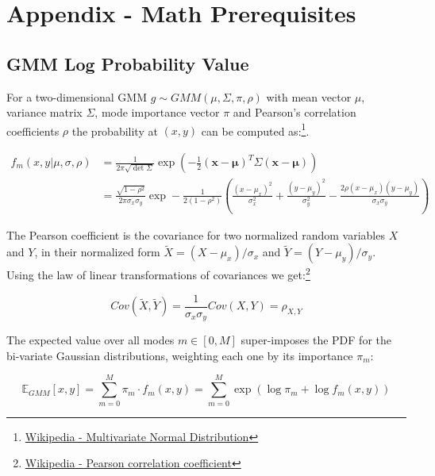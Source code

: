 \chapter{Appendix - Math Prerequisites}

\section{GMM Log Probability Value}
\label{appendix:gmm_log_prob}
For a two-dimensional \ac{GMM} $g \sim GMM(\mu, \Sigma, \pi, \rho)$ with mean vector $\mu$, variance matrix $\Sigma$, mode importance vector $\pi$ and Pearson's correlation coefficients $\rho$ the probability at $(x, y)$ can be computed as:\footnote{\href{https://de.wikipedia.org/wiki/Mehrdimensionale_Normalverteilung}{Wikipedia - Multivariate Normal Distribution}}.

\begin{align}
f_m(x, y | \mu, \sigma, \rho) 
&= \frac{1}{2 \pi \sqrt{\det \Sigma}} \exp \left(- \frac{1}{2} (\boldsymbol{x} - \boldsymbol{\mu})^T \Sigma (\boldsymbol{x} - \boldsymbol{\mu}) \right) \\
&= {\frac{\sqrt{1- \rho^2}}{2 \pi \sigma_x \sigma_y} 
\exp - \frac{1}{2 (1 - \rho^2)}} \left( \frac{( x - \mu _x)^2}{\sigma_x^2} +
\frac {(y - \mu_y)^2}{\sigma_y^2}-{\frac {2\rho (x - \mu_x)(y - \mu_y)}
{\sigma_x \sigma_y}} \right)	
\end{align}

The Pearson coefficient is the covariance for two normalized random variables $X$ and $Y$, in their normalized form $\tilde{X} = (X - \mu_x)/\sigma_x$ and $\tilde{Y} = (Y - \mu_y) / \sigma_y$. Using the law of linear transformations of covariances we get:\footnote{\href{https://en.wikipedia.org/wiki/Pearson_correlation_coefficient}{Wikipedia - Pearson correlation coefficient}} 

\begin{equation}
Cov(\tilde{X}, \tilde{Y}) = \frac{1}{\sigma_x \sigma_y} Cov(X, Y) = \rho_{X, Y}
\end{equation}

The expected value over all modes $m \in [0, M]$ super-imposes the \ac{PDF} for the bi-variate Gaussian distributions, weighting each one by its importance $\pi_m$:

\begin{equation}
\mathbb{E}_{GMM}[x, y] = \sum_{m=0}^M \pi_m \cdot f_m(x, y) =  \sum_{m=0}^M \exp \left( \log \pi_m + \log f_m(x, y) \right)	
\end{equation}

